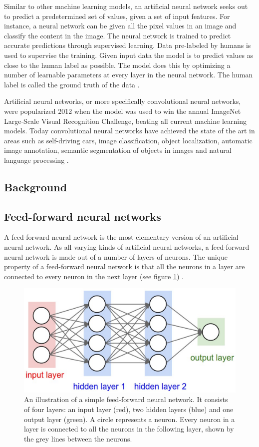 \documentclass[a4paper, twoside]{article}
\begin{document}
Similar to other machine learning models, an artificial neural network seeks out to predict a predetermined set of values, given a set of input features. For instance, a neural network can be given all the pixel values in an image and classify the content in the image. The neural network is trained to predict accurate predictions through supervised learning. Data pre-labeled by humans is used to supervise the training. Given input data the model is to predict values as close to the human label as possible. The model does this by optimizing a number of learnable parameters at every layer in the neural network. The human label is called the ground truth of the data \cite{cs231n}.

Artificial neural networks, or more specifically convolutional neural networks, were popularized 2012 when the model was used to win the annual ImageNet Large-Scale Visual Recognition Challenge, beating all current machine learning models. Today convolutional neural networks have achieved the state of the art in areas such as self-driving cars, image classification, object localization, automatic image annotation, semantic segmentation of objects in images and natural language processing \cite{cs231n}.

\subsection{Background}
\subsection{Feed-forward neural networks}
A feed-forward neural network is the most elementary version of an artificial neural network. As all varying kinds of artificial neural networks, a feed-forward neural network is made out of a number of layers of neurons. The unique property of a feed-forward neural network is that all the neurons in a layer are connected to every neuron in the next layer (see figure \ref{figfeedforward}) \cite{cs231n}.

\begin{figure}[h]
	\centering
  		\includegraphics[scale=1]{feedforward.png}
  	\caption{An illustration \cite{hidden12} of a simple feed-forward neural network. It consists of four layers: an input layer (red), two hidden layers (blue) and one output layer (green). A circle represents a neuron. Every neuron in a layer is connected to all the neurons in the following layer, shown by the grey lines between the neurons. } \label{figfeedforward}
\end{figure}
\end{document}
